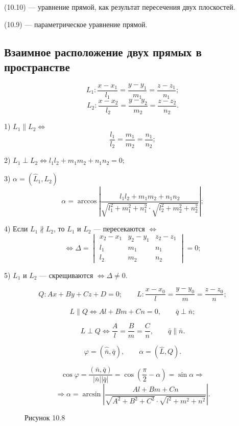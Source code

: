\documentclass[12pt,a4paper]{article}
\newcommand{\vn}{\bar n}
\newcommand{\vq}{\bar q}
\begin{document}
(10.10) --- уравнение прямой, как результат пересечения двух плоскостей.

(10.9) --- параметрическое уравнение прямой.

\subsection*{\textbf{Взаимное расположение двух прямых в пространстве}}

$$
L_1:\frac{x-x_1}{l_1}=\frac{y-y_1}{m_1}=\frac{z-z_1}{n_1};
$$
$$
L_2:\frac{x-x_2}{l_2}=\frac{y-y_2}{m_2}=\frac{z-z_2}{n_2}.
$$

1) $L_1\parallel L_2\Leftrightarrow$
$$
\frac{l_1}{l_2}=\frac{m_1}{m_2}=\frac{n_1}{n_2};
$$

2) $L_1\perp L_2\Leftrightarrow l_1l_2+m_1m_2+n_1n_2=0$;

3) $\alpha=(\hat L_1,L_2)$
$$
\alpha=\arccos\left|
\frac{l_1l_2+m_1m_2+n_1n_2}
{\sqrt{l_1^2+m_1^2+n_1^2}\cdot\sqrt{l_2^2+m_2^2+n_2^2}}
\right|;
$$

4) Если $L_1\nparallel L_2$, то $L_1$ и $L_2$ --- пересекаются $\Leftrightarrow$
$$
\Leftrightarrow
\Delta=
\begin{vmatrix}
x_2-x_1 & y_2-y_1 & z_2-z_1\\
l_1 & m_1 & n_1\\
l_2 & m_2 & n_2
\end{vmatrix}=0;
$$

5) $L_1$ и $L_2$ --- скрещиваются $\Leftrightarrow \Delta\ne0$.

$$
Q:Ax+By+Cz+D=0;
\qquad
L:\frac{x-x_0}{l}=\frac{y-y_0}{m}=\frac{z-z_0}{n};
$$

$$
L\parallel Q\Leftrightarrow Al+Bm+Cn=0,\qquad \vq\perp\vn;
$$

$$
L\perp Q\Leftrightarrow \frac Al=\frac Bm=\frac Cn,\qquad \vq\parallel\vn.
$$

$$
\varphi=(\hat\vn,\vq),
\qquad
\alpha=(\hat L,Q).
$$

\begin{figure}[H]
\centering
\begin{minipage}{0.4\textwidth}
\centering
{}
\caption*{Рисунок 10.8}
\end{minipage}%
\begin{minipage}{0.55\textwidth}
$$
\cos\varphi=\frac{(\vn,\vq)}{|\vn||\vq|}
=\cos\left(\frac\pi2-\alpha\right)=\sin\alpha
\Rightarrow
$$
$$
\Rightarrow
\alpha=\arcsin\left|
\frac{Al+Bm+Cn}
{\sqrt{A^2+B^2+C^2}\cdot\sqrt{l^2+m^2+n^2}}
\right|.
$$
\end{minipage}
\end{figure}
\end{document}
